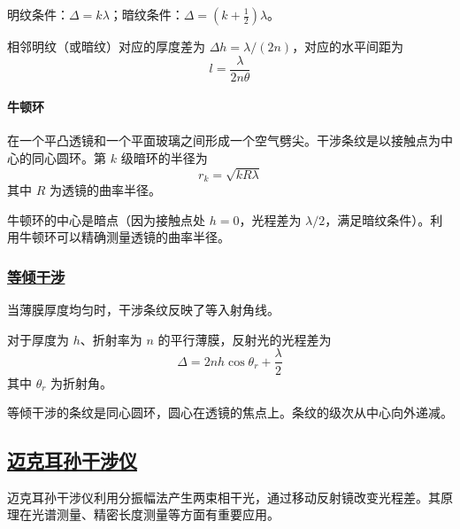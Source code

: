 明纹条件：$\Delta = k\lambda$；暗纹条件：$\Delta = (k + \frac{1}{2})\lambda$。

相邻明纹（或暗纹）对应的厚度差为 $\Delta h = \lambda/(2n)$，对应的水平间距为
\begin{equation}
    l = \frac{\lambda}{2n\theta}
\end{equation}

\paragraph*{牛顿环}

\begin{definition}[牛顿环]
    在一个平凸透镜和一个平面玻璃之间形成一个空气劈尖。干涉条纹是以接触点为中心的同心圆环。第 $k$ 级暗环的半径为
    \begin{equation}
        r_k = \sqrt{kR\lambda}
    \end{equation}
    其中 $R$ 为透镜的曲率半径。
\end{definition}

\begin{remark}
    牛顿环的中心是暗点（因为接触点处 $h = 0$，光程差为 $\lambda/2$，满足暗纹条件）。利用牛顿环可以精确测量透镜的曲率半径。
\end{remark}

\subsubsection{\protect\hyperlink{:}{等倾干涉}}

当薄膜厚度均匀时，干涉条纹反映了等入射角线。

\begin{definition}[等倾干涉的光程差]
    对于厚度为 $h$、折射率为 $n$ 的平行薄膜，反射光的光程差为
    \begin{equation}
        \Delta = 2nh\cos\theta_r + \frac{\lambda}{2}
    \end{equation}
    其中 $\theta_r$ 为折射角。
\end{definition}

等倾干涉的条纹是同心圆环，圆心在透镜的焦点上。条纹的级次从中心向外递减。

\subsection{\protect\hyperlink{:}{迈克耳孙干涉仪}}

迈克耳孙干涉仪利用分振幅法产生两束相干光，通过移动反射镜改变光程差。其原理在光谱测量、精密长度测量等方面有重要应用。


